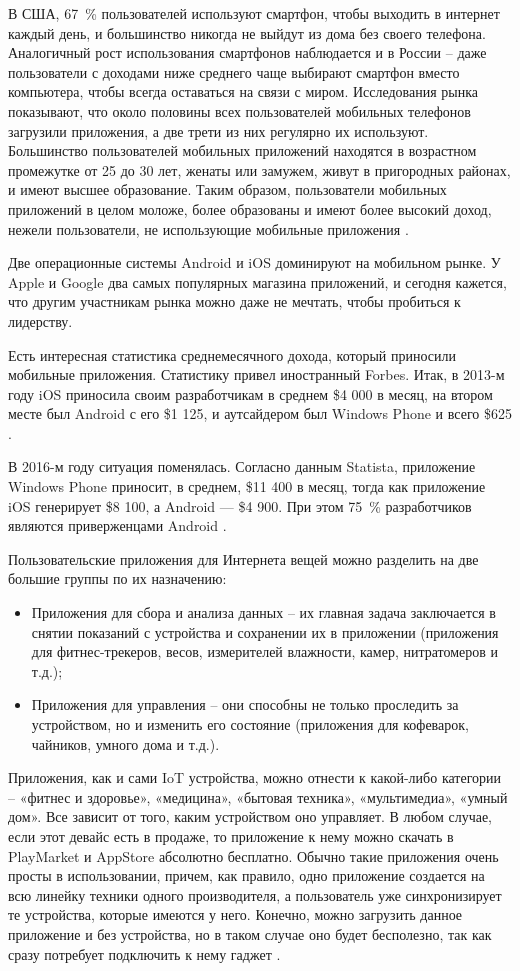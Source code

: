 В США, 67~\% пользователей используют смартфон, чтобы выходить в интернет каждый день, и большинство никогда не выйдут из дома без своего телефона. Аналогичный рост использования смартфонов наблюдается и в России – даже пользователи с доходами ниже среднего чаще выбирают смартфон вместо компьютера, чтобы всегда оставаться на связи с миром. Исследования рынка показывают, что около половины всех пользователей мобильных телефонов загрузили приложения, а две трети из них регулярно их используют. Большинство пользователей мобильных приложений находятся в возрастном промежутке от 25 до 30 лет, женаты или замужем, живут в пригородных районах, и имеют высшее образование. Таким образом, пользователи мобильных приложений в целом моложе, более образованы и имеют более высокий доход, нежели пользователи, не использующие мобильные приложения \cite{mobile_market}.

Две операционные системы Android и iOS доминируют на мобильном рынке. У Apple и Google два самых популярных магазина приложений, и сегодня кажется, что другим участникам рынка можно даже не мечтать, чтобы пробиться к лидерству.

Есть интересная статистика среднемесячного дохода, который приносили мобильные приложения. Статистику привел иностранный Forbes. Итак, в 2013-м году iOS приносила своим разработчикам в среднем \$4 000 в месяц, на втором месте был Android с его \$1 125, и аутсайдером был Windows Phone и всего \$625 \cite{mobile_tendency}.

В 2016-м году ситуация поменялась. Согласно данным Statista, приложение Windows Phone приносит, в среднем, \$11 400 в месяц, тогда как приложение iOS генерирует \$8 100, а Android — \$4 900. При этом 75~\% разработчиков являются приверженцами Android \cite{mobile_tendency}.

Пользовательские приложения для Интернета вещей можно разделить на две большие группы по их назначению:
\begin{itemize}
    \item Приложения для сбора и анализа данных – их главная задача заключается в снятии показаний с устройства и сохранении их в приложении (приложения для фитнес-трекеров, весов, измерителей влажности, камер, нитратомеров и т.д.);
    \item Приложения для управления – они способны не только проследить за устройством, но и изменить его состояние (приложения для кофеварок, чайников, умного дома и т.д.).
\end{itemize}

Приложения, как и сами IoT устройства, можно отнести к какой-либо категории – «фитнес и здоровье», «медицина», «бытовая техника», «мультимедиа», «умный дом». Все зависит от того, каким устройством оно управляет. В любом случае, если этот девайс есть в продаже, то приложение к нему можно скачать в PlayMarket и AppStore абсолютно бесплатно. Обычно такие приложения очень просты в использовании, причем, как правило, одно приложение создается на всю линейку техники одного производителя, а пользователь уже синхронизирует те устройства, которые имеются у него. Конечно, можно загрузить данное приложение и без устройства, но в таком случае оно будет бесполезно, так как сразу потребует подключить к нему гаджет \cite{mobile_apps_iot}.

